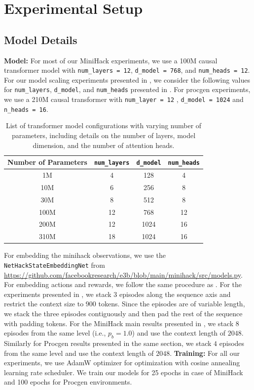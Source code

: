 \documentclass[]{fairmeta}
\begin{document}
\section{Experimental Setup}
\subsection{Model Details}
\label{app:model_details}
\textbf{Model:}
For most of our MiniHack experiments, we use a 100M causal transformer model with \texttt{num\_layers = 12}, \texttt{d\_model = 768}, and \texttt{num\_heads = 12}. For our model scaling experiments presented in , we consider the following values for \texttt{num\_layers}, \texttt{d\_model}, and \texttt{num\_heads} presented in . For procgen experiments, we use a 210M causal transformer with \texttt{num\_layer = 12} , \texttt{d\_model = 1024} and \texttt{n\_heads = 16}.
\begin{table}[h!]
\centering
\begin{tabular}{c c c c}
\hline
Number of Parameters & \texttt{num\_layers} & \texttt{d\_model} & \texttt{num\_heads} \\
\hline\hline
1M & 4 & 128 & 4\\
10M & 6 & 256 & 8 \\
30M & 8 & 512 & 8 \\
100M & 12 & 768 & 12 \\
200M & 12 & 1024 & 16 \\
310M & 18 & 1024 & 16 \\
\hline
\end{tabular}
\caption{List of transformer model configurations with varying number of parameters, including details on the number of layers, model dimension, and the number of attention heads.}
\label{tab:model_details}
\end{table}
For embedding the minihack observations, we use the \texttt{NetHackStateEmbeddingNet} from \href{https://github.com/facebookresearch/e3b/blob/main/minihack/src/models.py#L589}{https://github.com/facebookresearch/e3b/blob/main/minihack/src/models.py}. For embedding actions and rewards, we follow the same procedure as \cite{decision_transformer}. For the experiments presented in , we stack $3$ episodes along the sequence axis and restrict the context size to $900$ tokens. Since the episodes are of variable length, we stack the three episodes contiguously and then pad the rest of the sequence with padding tokens. For the MiniHack main results presented in , we stack $8$ episodes from the same level (i.e., $p_b = 1.0$) and use the context length of $2048$. Similarly for Procgen results presented in the same section, we stack $4$ episodes from the same level and use the context length of $2048$.
\textbf{Training:} For all our experiments, we use AdamW optimizer \citep{shen2023unified} for optimization with cosine annealing learning rate scheduler. We train our models for 25 epochs in case of MiniHack and 100 epochs for Procgen environments.
\end{document}
